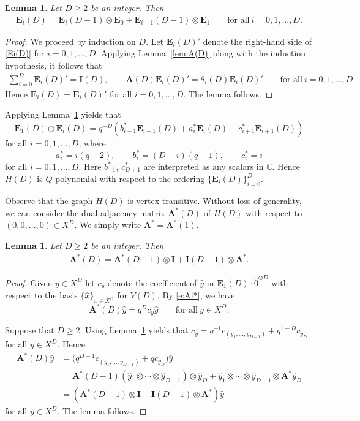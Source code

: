 \documentclass[10pt,a4paper]{amsart}
\def\A{\mathbf A}
\def\E{\mathbf E}
\def\C{\mathbb C}
\def\I{\mathbf I}
\numberwithin{equation}{section}
\newtheorem{Lemma}[Theorem]{Lemma}
\begin{document}
\begin{Lemma}\label{lem:Ei(D)}
Let $D\geq 2$ be an integer. Then
\begin{gather}\label{Ei(D)}
\E_i(D)=\E_i(D-1)\otimes \E_0+\E_{i-1}(D-1)\otimes \E_1
\qquad
\text{for all}\ i=0,1,\dots,D.
\end{gather}
\end{Lemma}

\begin{proof}
We proceed by induction on $D$.
Let $\E_i(D)'$ denote the right-hand side of \eqref{Ei(D)} for $i=0,1,\dots,D$.
Applying Lemma~\ref{lem:A(D)} along with the induction hypothesis, it follows that
\begin{gather*}
\sum_{i=0}^D \E_i(D)' =\I(D),
\qquad
\A(D) \E_i(D)'=\theta_i(D)\E_i(D)'
\qquad \text{for all}\ i=0,1,\dots,D.
\end{gather*}
Hence $\E_i(D)=\E_i(D)'$ for all $i=0,1,\dots,D$. The lemma follows.
\end{proof}



Applying Lemma~\ref{lem:Ei(D)} yields that
\[
\E_1(D)\odot \E_i(D)=
q^{-D}(b_{i-1}^* \E_{i-1}(D)+a_i^* \E_i(D)+c_{i+1}^* \E_{i+1}(D))
\]
for all $i=0,1,\dots,D$, where
\[
a_i^*=i(q-2),\qquad
b_i^*=(D-i)(q-1),\qquad
c_i^*=i
\]
for all $i=0,1,\dots,D$. Here $b_{-1}^*$, $c_{D+1}^*$ are interpreted as any scalars in $\C$.
Hence $H(D)$ is $Q$-polynomial with respect to the ordering $\{\E_i(D)\}_{i=0}^D$.

Observe that the graph $H(D)$ is vertex-transitive. Without loss of generality, we can consider the dual adjacency matrix $\A^*(D)$ of $H(D)$ with respect to $(0,0,\dots,0)\in X^D$. We simply write $\A^*=\A^*(1)$.

\begin{Lemma}\label{lem:A*(D)}
Let $D\geq 2$ be an integer. Then
\begin{gather*}
\A^*(D)=\A^*(D-1)\otimes \I+\I(D-1)\otimes \A^*.
\end{gather*}
\end{Lemma}

\begin{proof}
Given $y\in X^D$ let $c_y$ denote the coefficient of $\hat y$ in $\E_1(D) \cdot \hat 0^{\otimes D}$ with respect to the basis $\{\hat x\}_{x\in X^D}$ for $V(D)$. By \eqref{e:Ai*}, we have
\[
\A^*(D)\hat y=q^D c_y \hat y\qquad
\text{for all}\ y\in X^D.
\]

Suppose that $D\geq 2$.
Using Lemma~\ref{lem:Ei(D)} yields that
$c_y=q^{-1} c_{(y_1,\dots,y_{D-1})}+q^{1-D} c_{y_D}$ for all $y\in X^D$.
Hence
\begin{align*}
\A^*(D)\hat y
&=\big(q^{D-1} c_{(y_1,\dots,y_{D-1})}+q c_{y_D}\big) \hat y
\\
&=\A^*(D-1) (\hat y_1\otimes \cdots \otimes \hat y_{D-1})\otimes \hat y_D+\hat y_1\otimes \cdots \otimes \hat y_{D-1}\otimes \A^* \hat y_D
\\
&=(\A^*(D-1)\otimes \I+\I(D-1)\otimes \A^*) \hat y
\end{align*}
for all $y\in X^D$. The lemma follows.
\end{proof}
\end{document}
